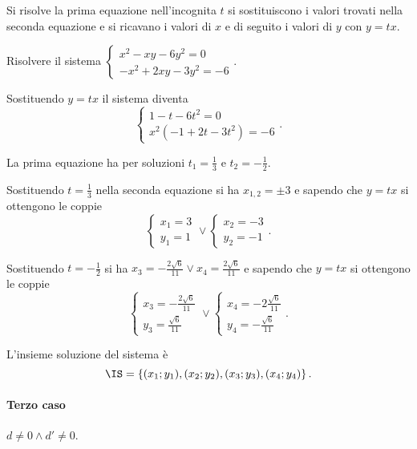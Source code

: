 Si risolve la prima equazione nell'incognita \(t\) si sostituiscono i valori trovati nella seconda equazione e si ricavano i valori di \(x\) e di seguito i valori di \(y\) con \(y={tx}\).
\newpage
\begin{exrig}
\begin{esempio}
Risolvere il sistema \(\left\{\begin{array}{l}x^2-{xy}-6y^2=0 \\-x^2+2{xy}-3y^2=-6 \end{array}\right.\).

Sostituendo \(y={tx}\) il sistema diventa 
\[\left\{\begin{array}{l}1-t-6t^2=0 \\x^2(-1+2t-3t^2)=-6 \end{array}\right..\]

La prima equazione ha per soluzioni \(t_1=\frac 1 3\) e \(t_2=-\frac 1 2\).

Sostituendo \(t=\frac 1 3\) nella seconda equazione si ha \(x_{1,2}=\pm 3\) e sapendo che \(y={tx}\) si ottengono le coppie 
\[\left\{\begin{array}{l}x_1=3\\y_1=1\end{array}\right.\vee\left\{\begin{array}{l}x_2=-3\\y_2=-1\end{array}\right..\]

Sostituendo \(t=-\frac 1 2\) si ha \(x_3=-\frac{2\sqrt 6}{11}\vee x_4=\frac{2\sqrt 6}{11}\) e sapendo che \(y={tx}\) si ottengono le coppie 
\[\left\{\begin{array}{l}x_3=-\frac{2\sqrt 6}{11}\\y_3=\frac{\sqrt 6}{11}\end{array}\right.\vee\left\{\begin{array}{l}x_4=-2\frac{\sqrt 6}{11}\\y_4=-\frac{\sqrt 6}{11}\end{array}\right..\]

L'insieme soluzione del sistema è 
\[\IS=\left\{(x_1;y_1),(x_2;y_2),(x_3;y_3),(x_4;y_4)\right\}.\]
\end{esempio}
\end{exrig}

\paragraph{Terzo caso} \(d\neq 0 \wedge d'\neq 0\).

